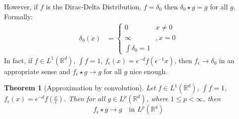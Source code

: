 \documentclass{report}
\theoremstyle{tommy}
\newtheorem{thm}[defn]{Theorem}
\begin{document}
  However, if \(f\) is the Dirac-Delta Distribution, \(f = \delta_0\) then \(\delta_0 \star g = g\) for all \(g\). Formally:
  \begin{align*}
    \delta_0(x) &= \begin{cases}
      0 & x \ne 0 \\
      \infty &, x = 0 \\
      \int \delta_0 = 1
    \end{cases}
  \end{align*}
  In fact, if \(f \in L^1(\mathbb{R}^d)\), \(\int f = 1\), \(f_\epsilon(x) = \epsilon^{-d} f(\epsilon^{-1} x)\), then \(f_\epsilon \to \delta_0\) in an appropriate sense and \(f_\epsilon \star g \to g\) for all \(g\) nice enough.

  
  \begin{thm}[Approximation by convolution]
    Let \(f \in L^1(\mathbb{R}^d)\), \(\int f = 1\), \(f_\epsilon(x) = \epsilon^{-d} f(\frac{x}{\epsilon})\). Then for all \(g \in L^p(\mathbb{R}^d)\), where \(1 \le p < \infty\), then
    \[f_\epsilon \star g \to g \quad \text{in } L^p(\mathbb{{R}^d})\]
  \end{thm}
\end{document}
